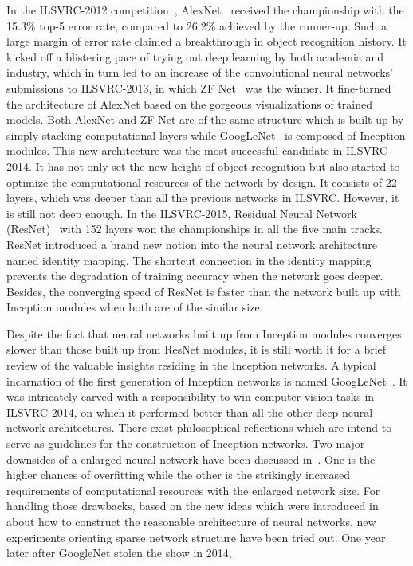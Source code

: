 In the ILSVRC-2012 competition~\parencite{RN205}, AlexNet~\parencite{RN65}
received the championship with the 15.3\% top-5 error rate, compared to
26.2\% achieved by the runner-up.
Such a large margin of error rate claimed a breakthrough in
object recognition history.
It kicked off a blistering pace of trying out deep learning by both academia
and industry, which in turn led to an increase of the convolutional
neural networks' submissions to ILSVRC-2013, in which ZF Net~\parencite{RN66}
was the winner.
It fine-turned the architecture of AlexNet based on the
gorgeous visualizations of trained models.
Both AlexNet and ZF Net are of the same structure which is built up
by simply stacking computational layers while GoogLeNet~\parencite{RN60}
is composed of Inception
modules.
This new architecture was the most successful candidate in ILSVRC-2014.
It has not only set the new height of object recognition but also started to
optimize the computational resources of the network by design.
It consists of 22 layers, which was deeper than all the previous
networks in ILSVRC\@.
However, it is still not deep enough.
In the ILSVRC-2015, Residual Neural Network (ResNet)~\parencite{RN67} with
152 layers won the championships in all the five main tracks.
ResNet introduced a brand new notion into the neural network architecture
named identity mapping.
The shortcut connection in the identity mapping prevents the degradation of
training accuracy when the network goes deeper.
Besides, the converging speed of ResNet is faster than the network built up
with Inception modules when both are of the similar size.

Despite the fact that neural networks built up from Inception modules
converges slower than those built up from ResNet modules, it is still
worth it for a brief review of the valuable insights residing in
the Inception networks.
A typical incarnation of the first generation of Inception networks is named
GoogLeNet~\parencite{RN60}.
It was intricately carved with a responsibility to win computer vision
tasks in ILSVRC-2014, on which it performed better than all the other
deep neural network architectures.
There exist philosophical reflections which are intend to serve as guidelines
for the construction of Inception networks.
Two major downsides of a enlarged neural network have been discussed
in~\parencite{RN60}.
One is the higher chances of overfitting while the other is
the strikingly increased requirements of computational resources with the
enlarged network size.
For handling those drawbacks, based on the new ideas which were introduced
in~\parencite{RN207} about how to construct the reasonable architecture of
neural networks, new experiments orienting sparse network structure have
been tried out.
One year later after GoogleNet stolen the show in 2014,



